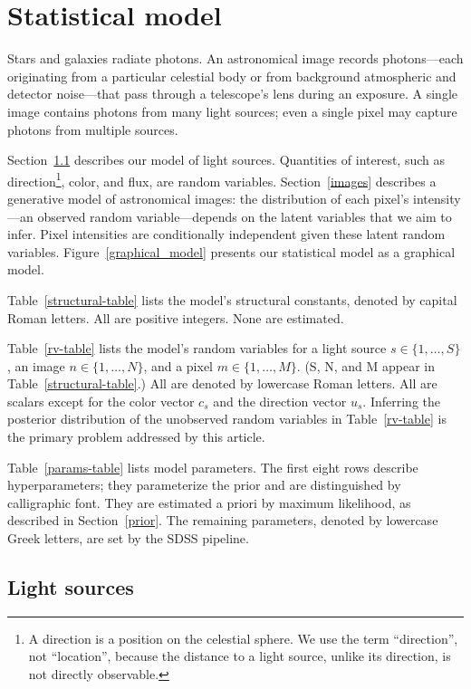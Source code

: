 \section{Statistical model}
\label{sec:model}
Stars and galaxies radiate photons. An astronomical image records photons---each originating from a particular
celestial body or from background atmospheric and detector noise---that pass through a telescope's lens during an exposure.
A single image contains photons from many light sources; even a single pixel may capture photons from multiple sources.

Section~\ref{light-sources} describes our model of light sources. Quantities of interest, such as direction\footnote{A direction is a position on the celestial sphere. We use the term ``direction'', not ``location'', because the distance to a light source, unlike its direction, is not directly observable.}, color, and flux, are random variables. Section~\ref{images} describes a generative model of astronomical images: the distribution of each pixel's intensity---an observed random variable---depends on the latent variables that we aim to infer. Pixel intensities are conditionally independent given these latent random variables.
Figure~\ref{graphical_model} presents our statistical model as a graphical model.

Table~\ref{structural-table} lists the model's structural constants,
denoted by capital Roman letters.
All are positive integers.
None are estimated.

Table~\ref{rv-table} lists the model's random variables for a light source $s \in \{1,\ldots,S\}$,
an image $n \in \{1,\ldots, N\}$,
and a pixel $m \in \{1,\ldots,M\}$.
(S, N, and M appear in Table~\ref{structural-table}.)
All are denoted by lowercase Roman letters.
All are scalars except for the color vector $c_s$ and the direction vector $u_s$.
Inferring the posterior distribution of the unobserved random variables in Table~\ref{rv-table} is the primary problem addressed by this article.

Table~\ref{params-table} lists model parameters.
The first eight rows describe hyperparameters; they parameterize the prior and are distinguished by calligraphic font.
They are estimated a priori by maximum likelihood, as described in Section~\ref{prior}.
The remaining parameters, denoted by lowercase Greek letters, are set by the SDSS pipeline.

\subsection{Light sources}
\label{light-sources}

